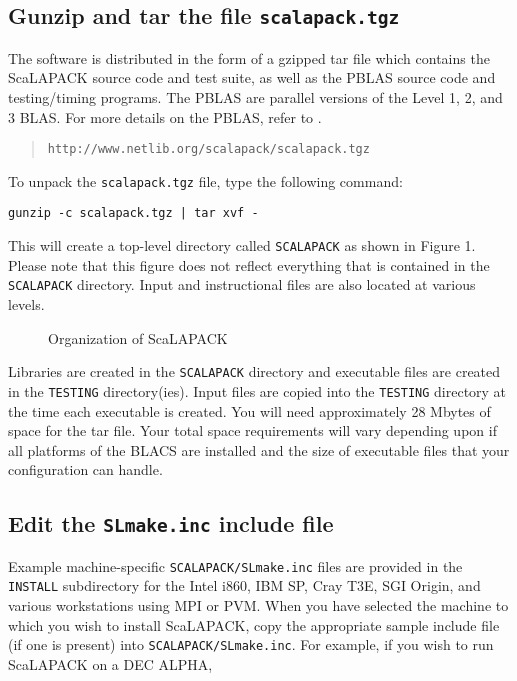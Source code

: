 \documentclass[11pt]{report}
\newcommand{\dent}{\hspace*{\parindent}}
\begin{document}
\subsection{Gunzip and tar the file {\tt scalapack.tgz}}

\dent
The software is distributed in the form of a gzipped
tar file which contains the ScaLAPACK source code and test suite,
as well as the PBLAS source code and testing/timing programs.
The PBLAS are parallel versions of the Level 1, 2, and 3 BLAS.  For
more details on the PBLAS, refer to \cite{lawn100,lawn80}.
\begin{quote}
{\tt http://www.netlib.org/scalapack/scalapack.tgz}
\end{quote}

To unpack the {\tt scalapack.tgz} file, type the following command:
 
\begin{list}{}{}
\item {\tt gunzip -c scalapack.tgz | tar xvf -}
\end{list}

\noindent
This will create a top-level directory called {\tt SCALAPACK} as
shown in Figure 1.  Please note that this figure does not reflect everything
that is contained in the {\tt SCALAPACK} directory.  Input and instructional
files are also located at various levels.
\begin{figure}[tbh!]
\vspace{0.3in}

\caption{Organization of ScaLAPACK}
\vspace{11pt}
\end{figure}
Libraries are created in the {\tt SCALAPACK} directory and 
executable files are created in the {\tt TESTING} directory(ies).  Input
files are copied into the {\tt TESTING} directory at the time each
executable is created.  You will need approximately 28 Mbytes of space
for the tar file.  Your total space requirements will vary depending upon
if all platforms of the BLACS are installed and the size of executable files
that your configuration can handle.

\subsection{Edit the {\tt SLmake.inc} include file}

\dent
Example machine-specific {\tt SCALAPACK/SLmake.inc} files are provided in
the {\tt INSTALL} subdirectory for the Intel i860, IBM SP, Cray T3E,
SGI Origin, and various workstations using MPI or PVM.
When you have selected the machine to
which you wish to install ScaLAPACK, copy the appropriate sample include
file (if one is present) into {\tt SCALAPACK/SLmake.inc}.  For example, if
you wish to run ScaLAPACK on a DEC ALPHA,
\end{document}

